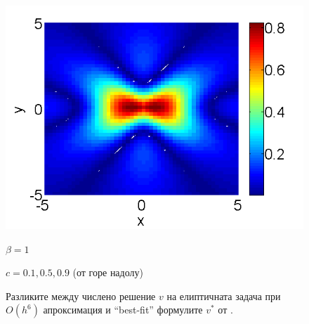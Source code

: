 \documentclass[a4paper]{article}
\theoremstyle{remark}
\begin{document}
\begin{large}
\begin{figure}[htbp]
\begin{minipage}[b]{0.48\linewidth}
		 \includegraphics[width=\linewidth]{BestFitVsSimpleIter/ChristovIC_50_bt1_c090_h02_O(h^6).png}
		\centerline{$\beta = 1$}
		\centerline{$c = 0.1, 0.5, 0.9$ (от горе надолу)}
	\end{minipage}
	\caption{Разликите между числено решение $v$ на елиптичната задача при $O(h^6)$ апроксимация и ``best-fit'' формулите $v^*$ от \cite{ref15}. }
	\label{fig:difference}
\end{figure}


\end{large}
\end{document}
